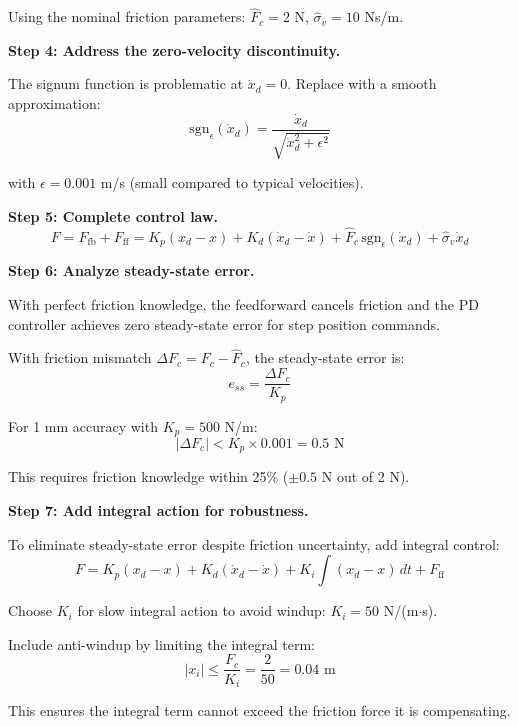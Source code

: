\begin{example}
Using the nominal friction parameters: $\hat{F}_c = 2$ N, $\hat{\sigma}_v = 10$ Ns/m.

\textbf{Step 4: Address the zero-velocity discontinuity.}

The signum function is problematic at $\dot{x}_d = 0$. Replace with a smooth approximation:
\begin{equation}
\text{sgn}_{\epsilon}(\dot{x}_d) = \frac{\dot{x}_d}{\sqrt{\dot{x}_d^2 + \epsilon^2}}
\end{equation}

with $\epsilon = 0.001$ m/s (small compared to typical velocities).

\textbf{Step 5: Complete control law.}
\begin{equation}
F = F_{\text{fb}} + F_{\text{ff}} = K_p(x_d - x) + K_d(\dot{x}_d - \dot{x}) + \hat{F}_c \, \text{sgn}_{\epsilon}(\dot{x}_d) + \hat{\sigma}_v \dot{x}_d
\end{equation}

\textbf{Step 6: Analyze steady-state error.}

With perfect friction knowledge, the feedforward cancels friction and the PD controller achieves zero steady-state error for step position commands.

With friction mismatch $\Delta F_c = F_c - \hat{F}_c$, the steady-state error is:
\begin{equation}
e_{ss} = \frac{\Delta F_c}{K_p}
\end{equation}

For 1 mm accuracy with $K_p = 500$ N/m:
\begin{equation}
|\Delta F_c| < K_p \times 0.001 = 0.5 \text{ N}
\end{equation}

This requires friction knowledge within 25\% ($\pm 0.5$ N out of 2 N).

\textbf{Step 7: Add integral action for robustness.}

To eliminate steady-state error despite friction uncertainty, add integral control:
\begin{equation}
F = K_p(x_d - x) + K_d(\dot{x}_d - \dot{x}) + K_i\int(x_d - x)\,dt + F_{\text{ff}}
\end{equation}

Choose $K_i$ for slow integral action to avoid windup: $K_i = 50$ N/(m$\cdot$s).

Include anti-windup by limiting the integral term:
\begin{equation}
|x_i| \leq \frac{F_c}{K_i} = \frac{2}{50} = 0.04 \text{ m}
\end{equation}

This ensures the integral term cannot exceed the friction force it is compensating.
\end{example}

